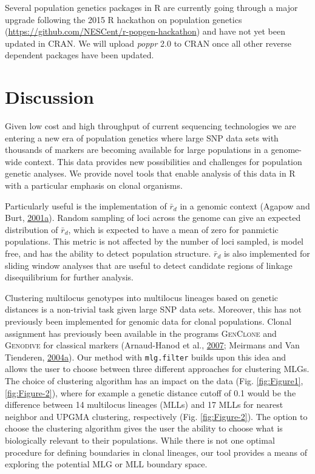 \documentclass[double,12pt]{beavtex}
\begin{document}
  Several population genetics packages in R are currently going through a
  major upgrade following the 2015 R hackathon on population genetics
  (\url{https://github.com/NESCent/r-popgen-hackathon}) and have not yet
  been updated in CRAN. We will upload \emph{poppr} 2.0 to CRAN once all
  other reverse dependent packages have been updated.
  
  \section{Discussion}\label{discussion}
  
  Given low cost and high throughput of current sequencing technologies we
  are entering a new era of population genetics where large SNP data sets
  with thousands of markers are becoming available for large populations
  in a genome- wide context. This data provides new possibilities and
  challenges for population genetic analyses. We provide novel tools that
  enable analysis of this data in R with a particular emphasis on clonal
  organisms.
  
  Particularly useful is the implementation of \(\bar{r}_d\) in a genomic
  context (Agapow and Burt,
  \protect\hyperlink{ref-Agapow_2001}{2001}\protect\hyperlink{ref-Agapow_2001}{a}).
  Random sampling of loci across the genome can give an expected
  distribution of \(\bar{r}_d\), which is expected to have a mean of zero
  for panmictic populations. This metric is not affected by the number of
  loci sampled, is model free, and has the ability to detect population
  structure. \(\bar{r}_d\) is also implemented for sliding window analyses
  that are useful to detect candidate regions of linkage disequilibrium
  for further analysis.
  
  Clustering multilocus genotypes into multilocus lineages based on
  genetic distances is a non-trivial task given large SNP data sets.
  Moreover, this has not previously been implemented for genomic data for
  clonal populations. Clonal assignment has previously been available in
  the programs \textsc{GenClone} and \textsc{Genodive} for classical
  markers (Arnaud-Hanod et al.,
  \protect\hyperlink{ref-arnaud2007standardizing}{2007}; Meirmans and Van
  Tienderen,
  \protect\hyperlink{ref-meirmans2004genotype}{2004}\protect\hyperlink{ref-meirmans2004genotype}{a}).
  Our method with \texttt{mlg.filter} builds upon this idea and allows the
  user to choose between three different approaches for clustering MLGs.
  The choice of clustering algorithm has an impact on the data (Fig.
  \ref{fig:Figure1}, \ref{fig:Figure-2}), where for example a genetic
  distance cutoff of 0.1 would be the difference between 14 multilocus
  lineages (MLLs) and 17 MLLs for nearest neighbor and UPGMA clustering,
  respectively (Fig. \ref{fig:Figure-2}). The option to choose the
  clustering algorithm gives the user the ability to choose what is
  biologically relevant to their populations. While there is not one
  optimal procedure for defining boundaries in clonal lineages, our tool
  provides a means of exploring the potential MLG or MLL boundary space.
  
\end{document}
